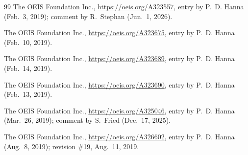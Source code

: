 \documentclass[11pt]{amsart}
\theoremstyle{plain}
\theoremstyle{definition}
\begin{document}
\begin{small}
\begin{thebibliography}{99}
The OEIS Foundation Inc., \url{https://oeis.org/A323557}, entry by P.~D. Hanna (Feb.~3, 2019); comment by R.~Stephan (Jun.~1, 2026).

The OEIS Foundation Inc., \url{https://oeis.org/A323675}, entry by P.~D. Hanna (Feb.~10, 2019).

The OEIS Foundation Inc., \url{https://oeis.org/A323689}, entry by P.~D. Hanna (Feb.~14, 2019).

The OEIS Foundation Inc., \url{https://oeis.org/A323690}, entry by P.~D. Hanna (Feb.~13, 2019).

The OEIS Foundation Inc., \url{https://oeis.org/A325046}, entry by P.~D. Hanna (Mar.~26, 2019); comment by S.~Fried (Dec.~17, 2025).

The OEIS Foundation Inc., \url{https://oeis.org/A326602}, entry by P.~D. Hanna (Aug.~8, 2019); revision \#19, Aug.~11, 2019.

\end{thebibliography}
\end{small}
\end{document}

